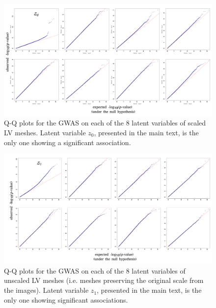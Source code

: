\documentclass[fleqn,10pt]{wlscirep}
\begin{document}
\begin{figure}
 \centering
 \includegraphics[width=\textwidth]{figs/supplementary/scaled_qq.png}
 \caption{Q-Q plots for the GWAS on each of the 8 latent variables of scaled LV meshes. Latent variable $z_0$, presented in the main text, is the only one showing a significant association.}
 \label{fig:qq_scaled}
\end{figure}

\begin{figure}
 \centering
 \includegraphics[width=\textwidth]{figs/supplementary/unscaled_qq.png}
 \caption{Q-Q plots for the GWAS on each of the 8 latent variables of unscaled LV meshes (i.e. meshes preserving the original scale from the images). Latent variable $z_1$, presented in the main text, is the only one showing significant associations.}
 \label{fig:qq_unscaled}
\end{figure}
\end{document}
